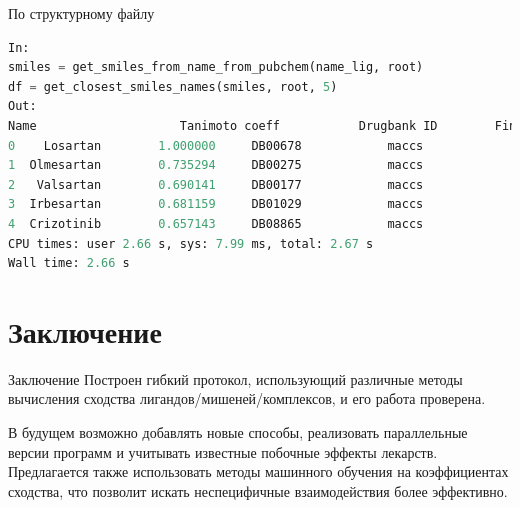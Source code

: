 \documentclass[14pt]{beamer}
\begin{document}
По структурному файлу
\begin{lstlisting}[basicstyle=\tiny, language=Python, label={lst:smiles-fing},]
In:
smiles = get_smiles_from_name_from_pubchem(name_lig, root)
df = get_closest_smiles_names(smiles, root, 5)
Out:
Name  					Tanimoto coeff			 Drugbank ID 		Fingerprint type
0    Losartan        1.000000     DB00678            maccs
1  Olmesartan        0.735294     DB00275            maccs
2   Valsartan        0.690141     DB00177            maccs
3  Irbesartan        0.681159     DB01029            maccs
4  Crizotinib        0.657143     DB08865            maccs
CPU times: user 2.66 s, sys: 7.99 ms, total: 2.67 s
Wall time: 2.66 s
\end{lstlisting}

\section{Заключение}
\begin{frame}{Заключение}
	Построен гибкий протокол, использующий различные методы вычисления сходства лигандов/мишеней/комплексов, и его работа проверена.
	
	В будущем возможно добавлять новые способы, реализовать параллельные версии программ и учитывать известные побочные эффекты лекарств. Предлагается также использовать методы машинного обучения на коэффициентах сходства, что позволит искать неспецифичные взаимодействия более эффективно.
\end{frame}
\end{document}
